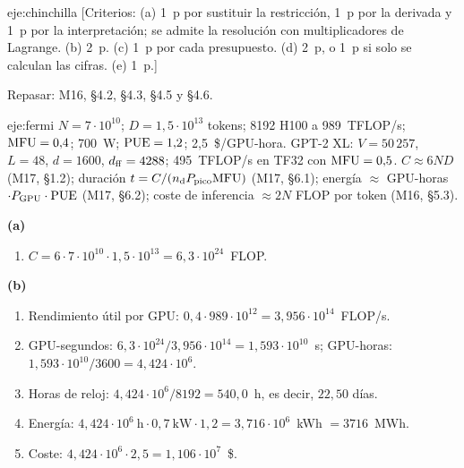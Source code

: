 \begin{solucion}{eje:chinchilla}
[Criterios: (a) 1~p por sustituir la restricción, 1~p por la derivada y 1~p por la interpretación; se admite la resolución con multiplicadores de Lagrange. (b) 2~p. (c) 1~p por cada presupuesto. (d) 2~p, o 1~p si solo se calculan las cifras. (e) 1~p.]

Repasar: M16, §4.2, §4.3, §4.5 y §4.6.
\end{solucion}

\begin{solucion}{eje:fermi}
\datos $N=7\cdot 10^{10}$; $D=1{,}5\cdot 10^{13}$ tokens; 8192 H100 a 989~TFLOP/s; $\mathrm{MFU}=0{,}4$; 700~W; $\mathrm{PUE}=1{,}2$; 2{,}5~\$/GPU-hora. GPT-2 XL: $V=50\,257$, $L=48$, $d=1600$, $d_{\mathrm{ff}}=4288$; 495~TFLOP/s en TF32 con $\mathrm{MFU}=0{,}5$.
\planteamiento $C\approx 6ND$ (M17, §1.2); duración $t=C/(n_{\mathrm{d}}P_{\mathrm{pico}}\mathrm{MFU})$ (M17, §6.1); energía $\approx$ GPU-horas $\cdot P_{\mathrm{GPU}}\cdot\mathrm{PUE}$ (M17, §6.2); coste de inferencia $\approx 2N$ FLOP por token (M16, §5.3).
\pasos

\noindent\textbf{(a)}
\begin{enumerate}[label=\arabic*.]
  \item $C=6\cdot 7\cdot 10^{10}\cdot 1{,}5\cdot 10^{13}=6{,}3\cdot 10^{24}$~FLOP.
\end{enumerate}

\noindent\textbf{(b)}
\begin{enumerate}[label=\arabic*.]
  \item Rendimiento útil por GPU: $0{,}4\cdot 989\cdot 10^{12}=3{,}956\cdot 10^{14}$~FLOP/s.
  \item GPU-segundos: $6{,}3\cdot 10^{24}/3{,}956\cdot 10^{14}=1{,}593\cdot 10^{10}$~s; GPU-horas: $1{,}593\cdot 10^{10}/3600=4{,}424\cdot 10^{6}$.
  \item Horas de reloj: $4{,}424\cdot 10^{6}/8192=540{,}0$~h, es decir, $22{,}50$ días.
  \item Energía: $4{,}424\cdot 10^{6}~\text{h}\cdot 0{,}7~\text{kW}\cdot 1{,}2=3{,}716\cdot 10^{6}$~kWh $=3716$~MWh.
  \item Coste: $4{,}424\cdot 10^{6}\cdot 2{,}5=1{,}106\cdot 10^{7}$~\$.
\end{enumerate}


\end{solucion}
